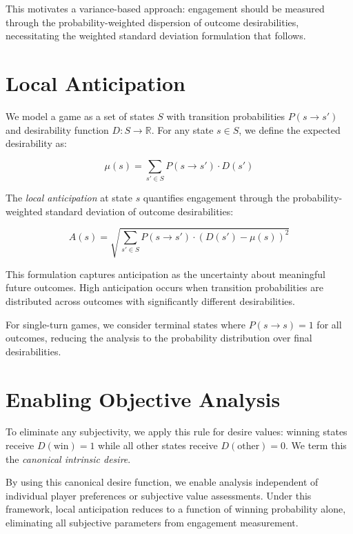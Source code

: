\documentclass{article}
\begin{document}
This motivates a variance-based approach: engagement should be measured through the probability-weighted dispersion of outcome desirabilities, necessitating the weighted standard deviation formulation that follows.

\section{Local Anticipation}

We model a game as a set of states $S$ with transition probabilities $P(s \to s')$ and desirability function $D: S \to \mathbb{R}$. For any state $s \in S$, we define the expected desirability as:

\begin{equation}
\mu(s) = \sum_{s' \in S} P(s \to s') \cdot D(s')
\end{equation}

The \emph{local anticipation} at state $s$ quantifies engagement through the probability-weighted standard deviation of outcome desirabilities:

\begin{equation}
A(s) = \sqrt{\sum_{s' \in S} P(s \to s') \cdot (D(s') - \mu(s))^2}
\end{equation}

This formulation captures anticipation as the uncertainty about meaningful future outcomes. High anticipation occurs when transition probabilities are distributed across outcomes with significantly different desirabilities.

For single-turn games, we consider terminal states where $P(s \to s) = 1$ for all outcomes, reducing the analysis to the probability distribution over final desirabilities.

\section{Enabling Objective Analysis}

To eliminate any subjectivity, we apply this rule for desire values: winning states receive $D(\text{win}) = 1$ while all other states receive $D(\text{other}) = 0$.
We term this the \emph{canonical intrinsic desire}.

By using this canonical desire function, we enable analysis independent of individual player preferences or subjective value assessments. Under this framework, local anticipation reduces to a function of winning probability alone, eliminating all subjective parameters from engagement measurement.
\end{document}
